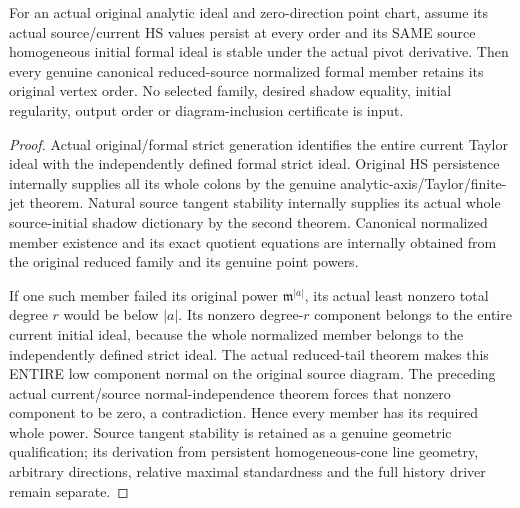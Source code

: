 \begin{theorem}
\label{hir:actual-zero-point-tangent-stable-persistent-hs-order-converse}
\leanok
For an actual original analytic ideal and zero-direction point chart,
assume its actual source/current HS values persist at every order and
its SAME source homogeneous initial formal ideal is stable under the
actual pivot derivative. Then every genuine canonical reduced-source
normalized formal member retains its original vertex order. No
selected family, desired shadow equality, initial regularity, output
order or diagram-inclusion certificate is input.
\end{theorem}
\begin{proof}
Actual original/formal strict generation identifies the entire current
Taylor ideal with the independently defined formal strict ideal.
Original HS persistence internally supplies all its whole colons by
the genuine analytic-axis/Taylor/finite-jet theorem. Natural source
tangent stability internally supplies its actual whole source-initial
shadow dictionary by the second theorem. Canonical normalized member
existence and its exact quotient equations are internally obtained from
the original reduced family and its genuine point powers.

If one such member failed its original power $\mathfrak m^{|a|}$,
its actual least nonzero total degree $r$ would be below $|a|$.
Its nonzero degree-$r$ component belongs to the entire current initial
ideal, because the whole normalized member belongs to the independently
defined strict ideal. The actual reduced-tail theorem makes this
ENTIRE low component normal on the original source diagram. The
preceding actual current/source normal-independence theorem forces
that nonzero component to be zero, a contradiction. Hence every member
has its required whole power. Source tangent stability is retained as
a genuine geometric qualification; its derivation from persistent
homogeneous-cone line geometry, arbitrary directions, relative maximal
standardness and the full history driver remain separate.
\end{proof}

